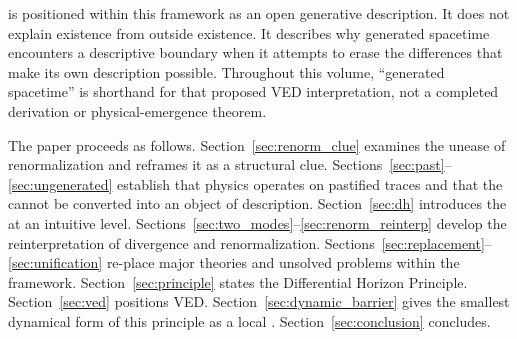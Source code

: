 \VED{} is positioned within this framework as an open generative
description.
It does not explain existence from outside existence.
It describes why generated spacetime encounters a descriptive boundary
when it attempts to erase the differences that make its own description
possible.
Throughout this volume, ``generated spacetime'' is shorthand for that proposed
VED interpretation, not a completed derivation or physical-emergence theorem.

The paper proceeds as follows.
Section~\ref{sec:renorm_clue} examines the unease of renormalization
and reframes it as a structural clue.
Sections~\ref{sec:past}--\ref{sec:ungenerated} establish
that physics operates on pastified traces
and that the \ungenerated{} cannot be converted into an object
of description.
Section~\ref{sec:dh} introduces the \DH{} at an intuitive level.
Sections~\ref{sec:two_modes}--\ref{sec:renorm_reinterp}
develop the reinterpretation of divergence and renormalization.
Sections~\ref{sec:replacement}--\ref{sec:unification}
re-place major theories and unsolved problems within the framework.
Section~\ref{sec:principle} states the Differential Horizon Principle.
Section~\ref{sec:ved} positions VED.
Section~\ref{sec:dynamic_barrier} gives the smallest dynamical form
of this principle as a local \DH{}.
Section~\ref{sec:conclusion} concludes.
